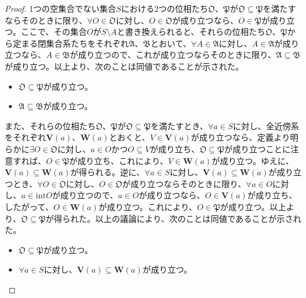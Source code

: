 \documentclass[dvipdfmx]{jsarticle}
\begin{document}
\begin{proof}
1つの空集合でない集合$S$における2つの位相たち$\mathfrak{O}$、$\mathfrak{P}$が$\mathfrak{O \subseteq P}$を満たすならそのときに限り、$\forall O \in \mathfrak{O}$に対し、$O \in \mathfrak{O}$が成り立つなら、$O \in \mathfrak{P}$が成り立つ。ここで、その集合$O$が$S \setminus A$と書き換えられると、それらの位相たち$\mathfrak{O}$、$\mathfrak{P}$から定まる閉集合系たちをそれぞれ$\mathfrak{A}$、$\mathfrak{B}$とおいて、$\forall A \in \mathfrak{A}$に対し、$A \in \mathfrak{A}$が成り立つなら、$A \in \mathfrak{B}$が成り立つので、これが成り立つならそのときに限り、$\mathfrak{A \subseteq B}$が成り立つ。以上より、次のことは同値であることが示された。
\begin{itemize}
\item
  $\mathfrak{O \subseteq P}$が成り立つ。
\item
  $\mathfrak{A \subseteq B}$が成り立つ。
\end{itemize}\par
また、それらの位相たち$\mathfrak{O}$、$\mathfrak{P}$が$\mathfrak{O \subseteq P}$を満たすとき、$\forall a \in S$に対し、全近傍系をそれぞれ$\mathbf{V}(a)$、$\mathbf{W}(a)$とおくと、$V \in \mathbf{V}(a)$が成り立つなら、定義より明らかに$\exists O \in \mathfrak{O}$に対し、$a \in O$かつ$O \subseteq V$が成り立ち、$\mathfrak{O \subseteq P}$が成り立つことに注意すれば、$O \in \mathfrak{P}$が成り立ち、これにより、$V \in \mathbf{W}(a)$が成り立つ。ゆえに、$\mathbf{V}(a) \subseteq \mathbf{W}(a)$が得られる。逆に、$\forall a \in S$に対し、$\mathbf{V}(a) \subseteq \mathbf{W}(a)$が成り立つとき、$\forall O \in \mathfrak{O}$に対し、$O \in \mathfrak{O}$が成り立つならそのときに限り、$\forall a \in O$に対し、$a \in {\mathrm{int}}O$が成り立つので、$a \in O$が成り立つなら、$O \in \mathbf{V}(a)$が成り立ち、したがって、$O \in \mathbf{W}(a)$が成り立つ。これにより、$O \in \mathfrak{P}$が成り立つ。以上より、$\mathfrak{O \subseteq P}$が得られた。以上の議論により、次のことは同値であることが示された。
\begin{itemize}
\item
  $\mathfrak{O \subseteq P}$が成り立つ。
\item
  $\forall a \in S$に対し、$\mathbf{V}(a) \subseteq \mathbf{W}(a)$が成り立つ。
\end{itemize}
\end{proof}
\end{document}

